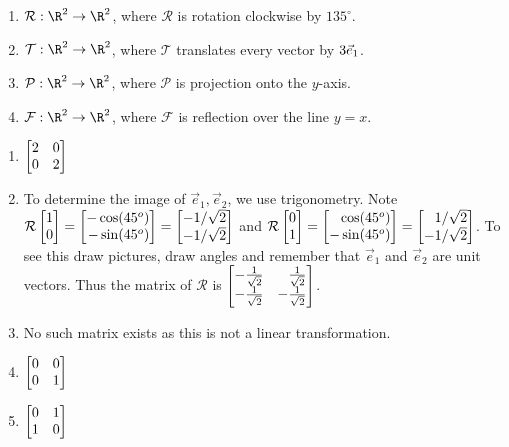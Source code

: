 \begin{exercises}
\begin{problist}
\begin{enumerate}
			\item $\mathcal{R}:\R^{2}\to\R^{2}$, where $\mathcal{R}$ is rotation
				clockwise by $135^{\circ}$.

			\item $\mathcal{T}:\R^{2}\to\R^{2}$, where $\mathcal{T}$ translates every
				vector by $3{\vec e_1}$.

			\item $\mathcal{P}:\R^{2}\to\R^{2}$, where $\mathcal{P}$ is projection
				onto the $y$-axis.

			\item $\mathcal{F}:\R^{2}\to\R^{2}$, where $\mathcal{F}$ is reflection
				over the line $y=x$.
		\end{enumerate}
		\begin{solution}
			\begin{enumerate}
				\item \label{itm:first} $\mat{2 & 0 \\ 0& 2}$

				\item To determine the image of $\vec{e}_{1}, \vec{e}_{2}$, we use
					trigonometry. Note
					$\mathcal{R}\mat{1\\0}= \mat
					{- \cos (45^{o}) \\ - \sin (45^{o})}= \mat
					{- 1/ \sqrt{2} \\ - 1/ \sqrt{2}}$
					and
					$\mathcal{R}\mat{0\\1}= \mat
					{ \cos (45^{o}) \\ - \sin (45^{o})}= \mat
					{ 1/ \sqrt{2} \\ -1/ \sqrt{2}}$. To see this draw pictures,
					draw angles and remember that $\vec{e}_{1}$ and
					$\vec{e}_{2}$ are unit vectors. Thus the matrix of $\mathcal{R}$
					is $\mat
					{- \frac{1 }{\sqrt{2}} & \frac{1 }{\sqrt{2}}\\ - \frac{1}{\sqrt{2}} & -\frac{1}{\sqrt{2}}}$.

				\item No such matrix exists as this is not a linear
					transformation.

				\item \label{itm:fourth} $\mat{0 & 0 \\ 0 & 1}$

				\item \label{itm:fifth} $\mat{0 & 1 \\ 1 & 0}$
			\end{enumerate}
		\end{solution}


\end{problist}
\end{exercises}
